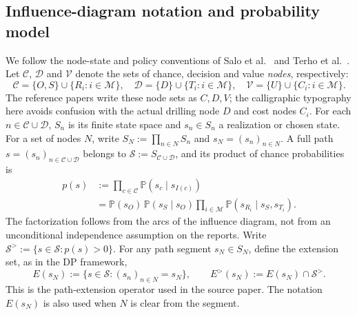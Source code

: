 \documentclass[11pt,a4paper]{article}
\newcommand{\Prob}{\mathbb{P}}
\newcommand{\calM}{\mathcal{M}}
\begin{document}
\subsection{Influence-diagram notation and probability model}\label{sec:notation}
We follow the node-state and policy conventions of
Salo et al.~\cite{Salo2022} and Terho et al.~\cite[Sections~2--3]{Terho2026}.
Let $\mathcal C$, $\mathcal D$ and $\mathcal V$ denote the sets of
chance, decision and value \emph{nodes}, respectively:
\begin{equation}\label{eq:nodesets}
 \mathcal C=\{O,S\}\cup\{R_i:i\in\calM\},\quad
 \mathcal D=\{D\}\cup\{T_i:i\in\calM\},\quad
 \mathcal V=\{U\}\cup\{C_i:i\in\calM\}.
\end{equation}
The reference papers write these node sets as $C,D,V$; the
calligraphic typography here avoids confusion with the actual drilling
node $D$ and cost nodes $C_i$.  For each $n\in\mathcal C\cup\mathcal D$,
$S_n$ is its finite state space and $s_n\in S_n$ a realization or
chosen state.  For a set of nodes $N$, write
$S_N:=\prod_{n\in N}S_n$ and $s_N=(s_n)_{n\in N}$.
A full path $s=(s_n)_{n\in\mathcal C\cup\mathcal D}$ belongs to
$\mathcal S:=S_{\mathcal C\cup\mathcal D}$, and its product of chance
probabilities is
\begin{equation}\label{eq:pathprob}
\begin{split}
 p(s)
  &:=\prod_{c\in\mathcal C}\Prob(s_c\mid s_{I(c)})\\
  &=\Prob(s_O)\,\Prob(s_S\mid s_O)
     \prod_{i\in\calM}
     \Prob(s_{R_i}\mid s_S,s_{T_i}).
\end{split}
\end{equation}
The factorization follows from the arcs of the influence diagram,
not from an unconditional independence assumption on the reports.
Write $\mathcal S^>:=\{s\in\mathcal S:p(s)>0\}$.  For any path
segment $s_N\in S_N$, define the extension set, as in the DP framework,
\begin{equation}\label{eq:extension}
 E(s_N):=\{s\in\mathcal S:(s_n)_{n\in N}=s_N\},\qquad
 E^>(s_N):=E(s_N)\cap\mathcal S^>.
\end{equation}
This is the path-extension operator used in the source paper.  The
notation $E(s_N)$ is also used when $N$ is clear from the segment.
\end{document}
